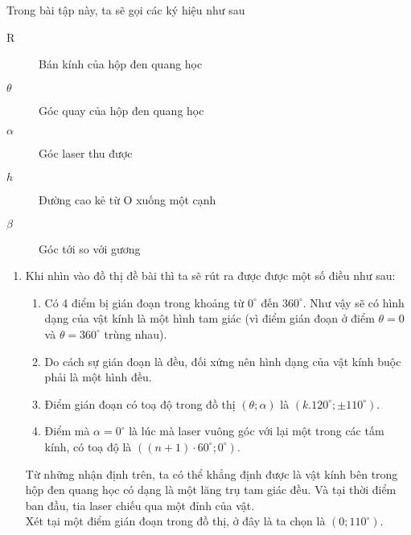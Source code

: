 Trong bài tập này, ta sẽ gọi các ký hiệu như sau 

\begin{description}
    \item[R] Bán kính của hộp đen quang học
   \item [$\theta$] Góc quay của hộp đen quang học
   \item [$\alpha$] Góc laser thu được
   \item [$h$] Đường cao kẻ từ O xuống một cạnh
   \item [$\beta$] Góc tới so với gương
\end{description}


\begin{enumerate}
\item 
Khi nhìn vào đồ thị đề bài thì ta sẽ rút ra được được một số điều như sau:
\begin{enumerate} 
    \item Có 4 điểm bị gián đoạn trong khoảng từ $0^\circ$ đến $360^\circ$. Như vậy sẽ có hình dạng của vật kính là một hình tam giác (vì điểm gián đoạn ở điểm $\theta=0$ và $\theta=360^\circ$ trùng nhau).
    \item Do cách sự gián đoạn là đều, đối xứng nên hình dạng của vật kính buộc phải là một hình đều.
    \item Điểm gián đoạn có toạ độ trong đồ thị $(\theta;\alpha)$ là $\left(k.120^\circ ; \pm 110^\circ \right)$.
    \item Điểm mà $\alpha=0^\circ$ là lúc mà laser vuông góc với lại một trong các tấm kính, có toạ độ là $\left( (n+1) \cdot 60^\circ ; 0^\circ \right)$.
\end{enumerate}
Từ những nhận định trên, ta có thể khẳng định được là vật kính bên trong hộp đen quang học có dạng là một lăng trụ tam giác đều. Và tại thời điểm ban đầu, tia laser chiếu qua một đỉnh của vật.
\\Xét tại một điểm gián đoạn trong đồ thị, ở đây là ta chọn là $\left(0;110^\circ \right)$. 
\begin{center}
    






\begin{tikzpicture}[x=0.75pt,y=0.75pt,yscale=-1,xscale=1]


\end{tikzpicture}
\end{center}
\end{enumerate}
